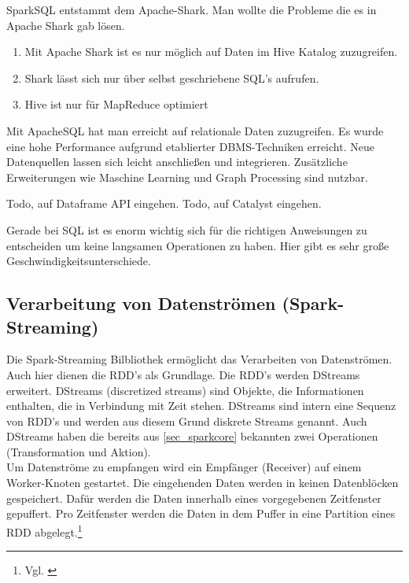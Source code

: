 SparkSQL entstammt dem Apache-Shark. Man wollte die Probleme die es in Apache Shark gab lösen.
\begin{enumerate}
	\item Mit Apache Shark ist es nur möglich auf Daten im Hive Katalog zuzugreifen. 
	\item Shark lässt sich nur über selbst geschriebene SQL's aufrufen. 
	\item Hive ist nur für MapReduce optimiert
\end{enumerate}

Mit ApacheSQL hat man erreicht auf relationale Daten zuzugreifen. Es wurde eine hohe Performance aufgrund etablierter DBMS-Techniken erreicht.
Neue Datenquellen lassen sich leicht anschließen und integrieren.
Zusätzliche Erweiterungen wie Maschine Learning und Graph Processing sind nutzbar.

Todo, auf Dataframe API eingehen.
Todo, auf Catalyst eingehen.


Gerade bei SQL ist es enorm wichtig sich für die richtigen Anweisungen zu entscheiden um keine langsamen Operationen zu haben. 
Hier gibt es sehr große Geschwindigkeitsunterschiede.

\newpage
\subsection{Verarbeitung von Datenströmen (Spark-Streaming)}


Die Spark-Streaming Bilbliothek ermöglicht das Verarbeiten von Datenströmen. Auch hier dienen die RDD's als Grundlage. Die RDD's werden DStreams erweitert. DStreams (discretized streams) sind Objekte, die Informationen enthalten, die in Verbindung mit Zeit stehen. DStreams sind intern eine Sequenz von RDD's und werden aus diesem Grund diskrete Streams genannt.
Auch DStreams haben die bereits aus \ref{sec_sparkcore} bekannten zwei Operationen (Transformation und Aktion). \\

\noindent
Um Datenströme zu empfangen wird ein Empfänger (Receiver) auf einem Worker-Knoten gestartet. Die eingehenden Daten werden in keinen Datenblöcken gespeichert. Dafür werden die Daten innerhalb eines vorgegebenen Zeitfenster gepuffert. Pro Zeitfenster werden die Daten in dem Puffer in eine Partition eines RDD abgelegt.\footnote{Vgl. \cite{BDS16}} \\

